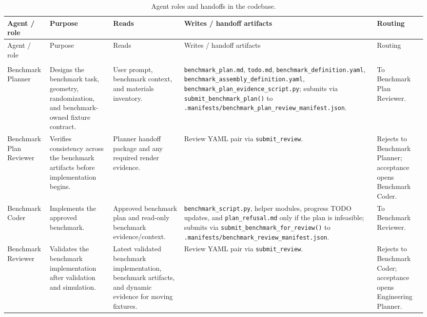 \documentclass[conference]{IEEEtran}
\begin{document}
\begingroup
\scriptsize
\setlength{\tabcolsep}{2pt}
\renewcommand{\arraystretch}{0.94}
\sloppy
\begin{longtable}{@{}%
  >{\raggedright\arraybackslash}p{}%
  >{\raggedright\arraybackslash}p{}%
  >{\raggedright\arraybackslash}p{}%
  >{\raggedright\arraybackslash}p{}%
  >{\raggedright\arraybackslash}p{}@{}}
\caption{Agent roles and handoffs in the codebase.}\label{tab:agent-handoffs}\\
\toprule\noalign{}
Agent / role & Purpose & Reads & Writes / handoff artifacts & Routing \\
\midrule\noalign{}
\endfirsthead
\toprule\noalign{}
Agent / role & Purpose & Reads & Writes / handoff artifacts & Routing \\
\midrule\noalign{}
\endhead
\bottomrule\noalign{}
\endlastfoot
\multicolumn{5}{@{}l}{\textbf{Benchmark agents}}\\
Benchmark Planner & Designs the benchmark task, geometry, randomization, and benchmark-owned fixture contract. & User prompt, benchmark context, and materials inventory. & \texttt{benchmark\_plan.md}, \texttt{todo.md}, \texttt{benchmark\_definition.yaml}, \texttt{benchmark\_assembly\_definition.yaml}, \texttt{benchmark\_plan\_evidence\_script.py}; submits via \texttt{submit\_benchmark\_plan()} to \texttt{.manifests/benchmark\_plan\_review\_manifest.json}. & To Benchmark Plan Reviewer. \\
Benchmark Plan Reviewer & Verifies consistency across the benchmark artifacts before implementation begins. & Planner handoff package and any required render evidence. & Review YAML pair via \texttt{submit\_review}. & Rejects to Benchmark Planner; acceptance opens Benchmark Coder. \\
Benchmark Coder & Implements the approved benchmark. & Approved benchmark plan and read-only benchmark evidence/context. & \texttt{benchmark\_script.py}, helper modules, progress TODO updates, and \texttt{plan\_refusal.md} only if the plan is infeasible; submits via \texttt{submit\_benchmark\_for\_review()} to \texttt{.manifests/benchmark\_review\_manifest.json}. & To Benchmark Reviewer. \\
Benchmark Reviewer & Validates the benchmark implementation after validation and simulation. & Latest validated benchmark implementation, benchmark artifacts, and dynamic evidence for moving fixtures. & Review YAML pair via \texttt{submit\_review}. & Rejects to Benchmark Coder; acceptance opens Engineering Planner. \\

\end{longtable}
\end{document}
